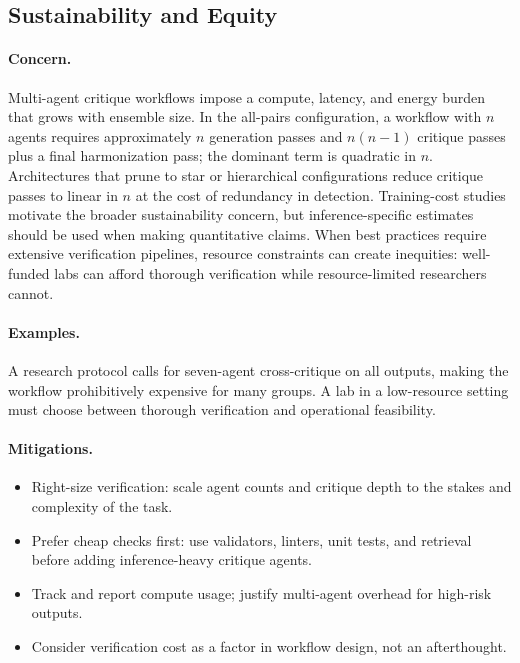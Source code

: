 \documentclass[11pt,letterpaper]{article}
\begin{document}
\subsection{Sustainability and Equity}

\paragraph{Concern.} Multi-agent critique workflows impose a compute, latency, and energy burden that grows with ensemble size. In the all-pairs configuration, a workflow with $n$ agents requires approximately $n$ generation passes and $n(n-1)$ critique passes plus a final harmonization pass; the dominant term is quadratic in $n$. Architectures that prune to star or hierarchical configurations reduce critique passes to linear in $n$ at the cost of redundancy in detection. Training-cost studies \cite{strubell2019,patterson2021} motivate the broader sustainability concern, but inference-specific estimates should be used when making quantitative claims. When best practices require extensive verification pipelines, resource constraints can create inequities: well-funded labs can afford thorough verification while resource-limited researchers cannot.

\paragraph{Examples.} A research protocol calls for seven-agent cross-critique on all outputs, making the workflow prohibitively expensive for many groups. A lab in a low-resource setting must choose between thorough verification and operational feasibility.

\paragraph{Mitigations.}
\begin{itemize}[leftmargin=*]
    \item Right-size verification: scale agent counts and critique depth to the stakes and complexity of the task.
    \item Prefer cheap checks first: use validators, linters, unit tests, and retrieval before adding inference-heavy critique agents.
    \item Track and report compute usage; justify multi-agent overhead for high-risk outputs.
    \item Consider verification cost as a factor in workflow design, not an afterthought.
\end{itemize}
\end{document}

